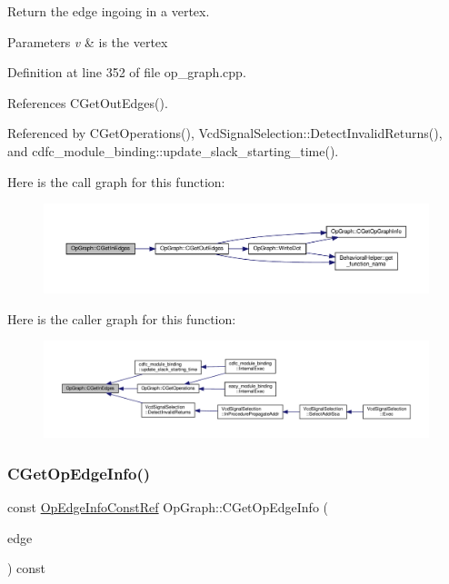 Return the edge ingoing in a vertex. 


\begin{DoxyParams}{Parameters}
{\em v} & is the vertex \\
\hline
\end{DoxyParams}


Definition at line 352 of file op\+\_\+graph.\+cpp.



References C\+Get\+Out\+Edges().



Referenced by C\+Get\+Operations(), Vcd\+Signal\+Selection\+::\+Detect\+Invalid\+Returns(), and cdfc\+\_\+module\+\_\+binding\+::update\+\_\+slack\+\_\+starting\+\_\+time().

Here is the call graph for this function\+:
\nopagebreak
\begin{figure}[H]
\begin{center}
\leavevmode
\includegraphics[width=350pt]{d6/d79/structOpGraph_a9619c072b9bc1e6990db32d43fb358ef_cgraph}
\end{center}
\end{figure}
Here is the caller graph for this function\+:
\nopagebreak
\begin{figure}[H]
\begin{center}
\leavevmode
\includegraphics[width=350pt]{d6/d79/structOpGraph_a9619c072b9bc1e6990db32d43fb358ef_icgraph}
\end{center}
\end{figure}
\mbox{\label{structOpGraph_ad029d85b1174dc53da7add156c68c30a}} 
\subsubsection{\texorpdfstring{C\+Get\+Op\+Edge\+Info()}{CGetOpEdgeInfo()}}
{\footnotesize\ttfamily const \hyperlink{op__graph_8hpp_ad56e1eade1e36cb8d170845855e19adc}{Op\+Edge\+Info\+Const\+Ref} Op\+Graph\+::\+C\+Get\+Op\+Edge\+Info (\begin{DoxyParamCaption}\item[{const \hyperlink{graph_8hpp_a9eb9afea34e09f484b21f2efd263dd48}{Edge\+Descriptor}}]{edge }\end{DoxyParamCaption}) const\hspace{0.3cm}{\ttfamily [inline]}}



